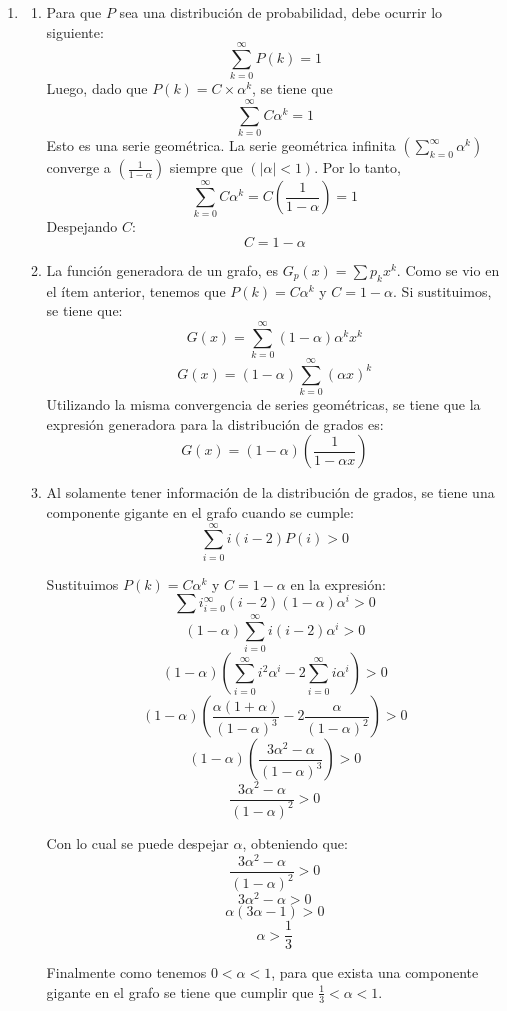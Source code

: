 \documentclass[12pt]{article}
\begin{document}
\begin{enumerate}
    \item 
    \begin{enumerate}
        \item Para que $P$ sea una distribución de probabilidad, debe ocurrir lo siguiente:
        $$\sum_{k=0}^{\infty}  P(k) = 1 $$
        Luego, dado que $P(k) = C \times \alpha ^k$, se tiene que 
        $$\sum_{k=0}^{\infty} C \alpha ^k= 1 $$
        Esto es una serie geométrica. La serie geométrica infinita $( \sum_{k=0}^{\infty} \alpha^k )$ converge a $( \frac{1}{1-\alpha} )$ siempre que $( |\alpha| < 1 )$. Por lo tanto,
        $$ \sum_{k=0}^{\infty} C \alpha ^k= C \left(\frac{1}{1-\alpha}\right) = 1 $$
        Despejando $C$:
        $$C = 1-\alpha$$

        \item La función generadora de un grafo, es $G_p(x) = \sum p_k x^k$. Como se vio en el ítem anterior, tenemos que $P(k) = C\alpha^k$ y $C = 1-\alpha$. Si sustituimos, se tiene que: 
        $$G(x) = \sum_{k=0}^{\infty}(1-\alpha)\alpha^k x^k$$ 
        $$G(x) = (1-\alpha)\sum_{k=0}^{\infty}(\alpha x)^k$$ 
        Utilizando la misma convergencia de series geométricas, se tiene que la expresión generadora para la distribución de grados es:
        $$G(x) = (1-\alpha)\left(\frac{1}{1-\alpha x}\right)$$

        \item Al solamente tener información de la distribución de grados, se tiene una componente gigante en el grafo cuando se cumple:
        $$\sum_{i=0}^{\infty} i (i - 2) P(i) > 0$$

        Sustituimos $P(k) = C\alpha^k$ y $C = 1-\alpha$ en la expresión:
        $$\sum i_{i=0}^{\infty} (i - 2) (1 - \alpha) \alpha^{i} > 0$$
        $$(1 - \alpha) \sum_{i=0}^{\infty} i (i - 2) \alpha^{i} > 0$$
        $$(1 - \alpha) (\sum_{i=0}^{\infty} i^{2} \alpha^{i} - 2 \sum_{i=0}^{\infty} i \alpha^{i}) > 0$$
        $$(1 - \alpha) (\frac{\alpha (1 + \alpha)}{(1-\alpha)^{3}} - 2 \frac{\alpha}{(1-\alpha)^{2}}) > 0$$
        $$(1 - \alpha) (\frac{3\alpha^{2} - \alpha}{(1-\alpha)^{3}}) > 0$$
        $$\frac{3\alpha^{2} - \alpha}{(1-\alpha)^{2}} > 0$$
        
        Con lo cual se puede despejar $\alpha$, obteniendo que:
        $$\frac{3\alpha^{2} - \alpha}{(1-\alpha)^{2}} > 0$$
        $$3\alpha^{2} - \alpha > 0$$
        $$\alpha (3\alpha - 1)> 0$$
        $$\alpha > \frac{1}{3}$$

        Finalmente como tenemos $0 < \alpha < 1$, para que exista una componente gigante en el grafo se tiene que cumplir que $\frac{1}{3} < \alpha < 1$.
    \end{enumerate}


\end{enumerate}
\end{document}
